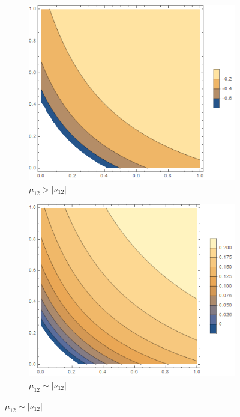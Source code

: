 \documentclass[12pt,a4]{article}
\begin{document}
\begin{figure}[!ht]
	\begin{subfigure}[b]{0.3\textwidth}
		\centering
		\includegraphics[width=\textwidth]{Joonised/GammaMu11Mu22I}
		\caption{$ \mu_{12} > |\nu_{12}| $}
	\end{subfigure}
	\hfill
	\begin{subfigure}[b]{0.3\textwidth}
		\centering
		\includegraphics[width=\textwidth]{Joonised/GammaMu11Mu22II}
		\caption{$ \mu_{12} \sim | \nu_{12}| $}
	\end{subfigure}

\end{figure}
\end{document}
